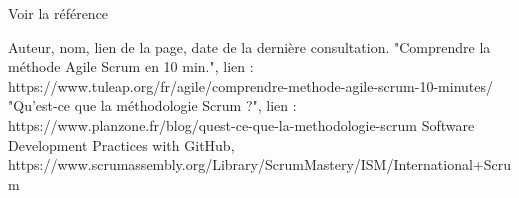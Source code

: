 \documentclass{article}
\begin{document}
Voir la référence \cite{maReference1}
        \begin{thebibliography}{10}
                Auteur, nom, lien de la page, date de la dernière consultation.
                "Comprendre la méthode Agile Scrum en 10 min.", lien : https://www.tuleap.org/fr/agile/comprendre-methode-agile-scrum-10-minutes/
                "Qu'est-ce que la méthodologie Scrum ?", lien : https://www.planzone.fr/blog/quest-ce-que-la-methodologie-scrum
                Software Development Practices with GitHub, https://www.scrumassembly.org/Library/ScrumMastery/ISM/International+Scrum%

    \end{thebibliography}
\end{document}
